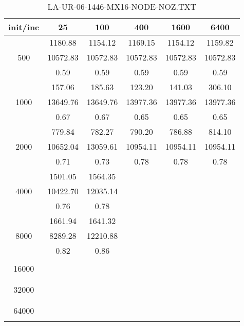 \begin{table}[th]
\caption{LA-UR-06-1446-MX16-NODE-NOZ.TXT}
\label{tab:LA-UR-06-1446-MX16-NODE-NOZ.TXT}
\centering
\begin{tabular}{|c||c|c|c|c|c|}
\hline
init/inc & 25 & 100 & 400 & 1600 & 6400 \\ \hline \hline
  & 1180.88 & 1154.12 & 1169.15 & 1154.12 & 1159.82\\ 
500  & 10572.83 & 10572.83 & 10572.83 & 10572.83 & 10572.83\\ 
  & 0.59 & 0.59 & 0.59 & 0.59 & 0.59\\ \hline 
  & 157.06 & 185.63 & 123.20 & 141.03 & 306.10\\ 
1000  & 13649.76 & 13649.76 & 13977.36 & 13977.36 & 13977.36\\ 
  & 0.67 & 0.67 & 0.65 & 0.65 & 0.65\\ \hline 
  & 779.84 & 782.27 & 790.20 & 786.88 & 814.10\\ 
2000  & 10652.04 & 13059.61 & 10954.11 & 10954.11 & 10954.11\\ 
  & 0.71 & 0.73 & 0.78 & 0.78 & 0.78\\ \hline 
  & 1501.05 & 1564.35 &  &  & \\ 
4000  & 10422.70 & 12035.14 &  &  & \\ 
  & 0.76 & 0.78 &  &  & \\ \hline 
  & 1661.94 & 1641.32 &  &  & \\ 
8000  & 8289.28 & 12210.88 &  &  & \\ 
  & 0.82 & 0.86 &  &  & \\ \hline 
  &  &  &  &  & \\ 
16000  &  &  &  &  & \\ 
  &  &  &  &  & \\ \hline 
  &  &  &  &  & \\ 
32000  &  &  &  &  & \\ 
  &  &  &  &  & \\ \hline 
  &  &  &  &  & \\ 
64000  &  &  &  &  & \\ 
  &  &  &  &  & \\ \hline 
\end{tabular}
\end{table}

